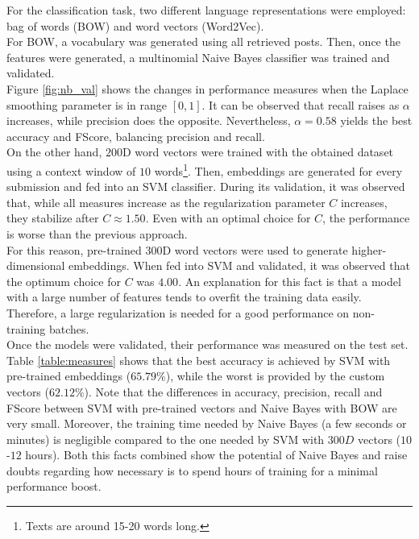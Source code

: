 \documentclass[11pt,a4paper]{article}
\begin{document}
For the classification task, two different language representations were employed: bag
of words (BOW) and word vectors (Word2Vec).\\
For BOW, a vocabulary was generated using all retrieved posts. Then, once the features
were generated, a multinomial Naive Bayes classifier was trained and validated.\\
Figure \ref{fig:nb_val} shows the changes in performance measures when the Laplace
smoothing parameter is in range $[0, 1]$. It can be observed that recall raises as
$\alpha$ increases, while precision does the opposite. Nevertheless, $\alpha = 0.58$
yields the best accuracy and FScore, balancing precision and recall.\\
On the other hand, $200$D word vectors were trained with the obtained dataset using
a context window of $10$ words\footnote{Texts are around 15-20 words long.}.
Then, embeddings are generated for every submission and fed into an SVM classifier.
During its validation, it was observed that, while all measures increase as the
regularization parameter $C$ increases, they stabilize after $C \approx 	1.50$. Even
with an optimal choice for $C$, the performance is worse than the previous approach.\\
For this reason, pre-trained $300$D word vectors were used to generate
higher-dimensional embeddings. When fed into SVM and validated, it was observed that
the optimum choice for $C$ was $4.00$. An explanation for this fact is that a model with
a large number of features tends to overfit the training data easily. Therefore, a large
regularization is needed for a good performance on non-training batches.\\

Once the models were validated, their performance was measured on the test set.\\
Table \ref{table:measures} shows that the best accuracy is achieved by SVM with
pre-trained embeddings ($65.79\%$), while the worst is provided by the custom vectors
($62.12\%$).
Note that the differences in accuracy, precision, recall and FScore between SVM with
pre-trained vectors and Naive Bayes with BOW are very small. Moreover, the training
time needed by Naive Bayes (a few seconds or minutes) is negligible compared to
the one needed by SVM with $300D$ vectors ($10$-$12$ hours). Both this facts
combined show the potential of Naive Bayes and raise doubts regarding how necessary
is to spend hours of training for a minimal performance boost.
\end{document}
